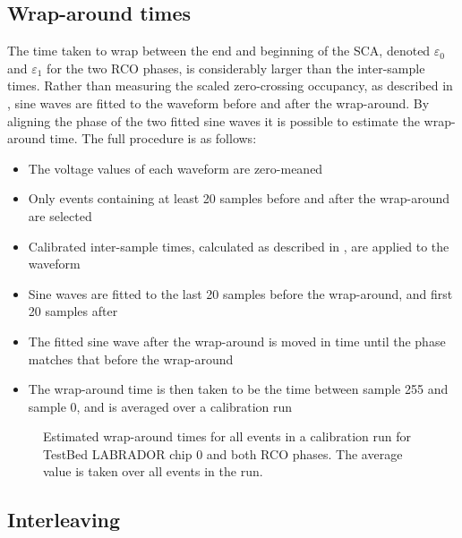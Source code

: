 \subsection{Wrap-around times}
\label{sec:calibration:LABRADOR-Digitiser-Chip:Wrap-around-times}

The time taken to wrap between the end and beginning of the SCA, denoted $\varepsilon_{0}$ and $\varepsilon_{1}$ for the two RCO phases, is considerably larger than the inter-sample times. Rather than measuring the scaled zero-crossing occupancy, as described in , sine waves are fitted to the waveform before and after the wrap-around. By aligning the phase of the two fitted sine waves it is possible to estimate the wrap-around time. The full procedure is as follows:

\begin{itemize}
\item The voltage values of each waveform are zero-meaned
\item Only events containing at least 20 samples before and after the wrap-around are selected
\item Calibrated inter-sample times, calculated as described in , are applied to the waveform 
\item Sine waves are fitted to the last 20 samples before the wrap-around, and first 20 samples after
\item The fitted sine wave after the wrap-around is moved in time until the phase matches that before the wrap-around
\item The wrap-around time is then taken to be the time between sample 255 and sample 0, and is averaged over a calibration run
\end{itemize}


\begin{figure}[htpb]
  \hfill
  \caption{Estimated wrap-around times for all events in a calibration run for TestBed LABRADOR chip 0 and both RCO phases. The average value is taken over all events in the run.}
  \label{fig:calibration:LABRADOR-Digitiser-Chip:Wrap-around}
\end{figure}


\subsection{Interleaving}
\label{sec:calibration:LABRADOR-Digitiser-Chip:Interleaving}

